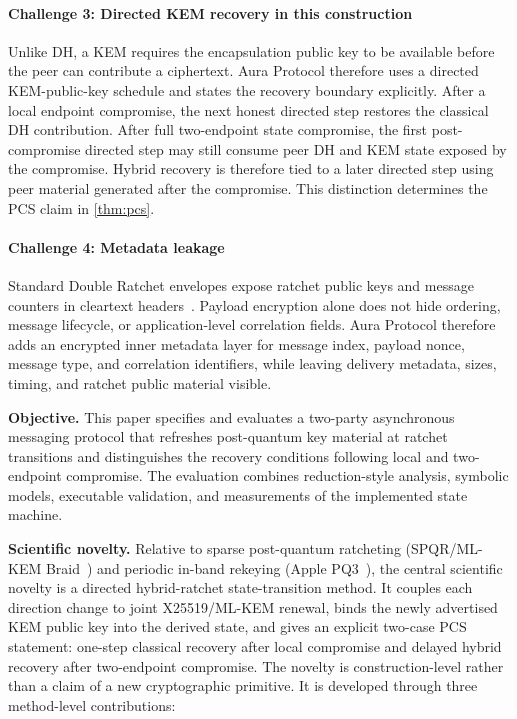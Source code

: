 \documentclass[preprint,12pt]{elsarticle}
\theoremstyle{definition}
\newcommand{\tech}[1]{\textnormal{#1}}
\newcommand{\SPQR}{\tech{SPQR}}
\newcommand{\PQThree}{\tech{PQ3}}
\begin{document}
\paragraph{Challenge 3: Directed KEM recovery in this construction}
Unlike DH, a KEM requires the encapsulation public key to be available before
the peer can contribute a ciphertext. Aura Protocol therefore uses a directed
KEM-public-key schedule and states the recovery boundary explicitly. After a
local endpoint compromise, the next honest directed step restores the classical
DH contribution. After full two-endpoint state compromise, the first
post-compromise directed step may still consume peer DH and KEM state exposed
by the compromise. Hybrid recovery is therefore tied to a later directed step
using peer material generated after the compromise. This distinction determines
the PCS claim in \cref{thm:pcs}.

\paragraph{Challenge 4: Metadata leakage}
Standard Double Ratchet envelopes expose ratchet public keys and message
counters in cleartext headers~\cite{signal-double-ratchet}. Payload encryption
alone does not hide ordering, message lifecycle, or application-level
correlation fields. Aura Protocol therefore adds an encrypted inner metadata
layer for message index, payload nonce, message type, and correlation
identifiers, while leaving delivery metadata, sizes, timing, and ratchet public
material visible.

\medskip
\noindent\textbf{Objective.} This paper specifies and evaluates a two-party
asynchronous messaging protocol that refreshes post-quantum key material at
ratchet transitions and distinguishes the recovery conditions following local
and two-endpoint compromise. The evaluation combines reduction-style analysis,
symbolic models, executable validation, and measurements of the implemented
state machine.

\medskip
\noindent\textbf{Scientific novelty.} Relative to sparse post-quantum
ratcheting (\SPQR{}/ML-KEM Braid~\cite{signal-spqr,signal-double-ratchet,mlkem-braid})
and periodic in-band rekeying (Apple \PQThree{}~\cite{apple-pq3,stebila-pq3,linker-pq3}),
the central scientific novelty is a directed hybrid-ratchet state-transition
method. It couples each direction change to joint X25519/ML-KEM renewal, binds
the newly advertised KEM public key into the derived state, and gives an
explicit two-case PCS statement: one-step classical recovery after local
compromise and delayed hybrid recovery after two-endpoint compromise. The
novelty is construction-level rather than a claim of a new cryptographic
primitive. It is developed through three method-level contributions:
\end{document}
